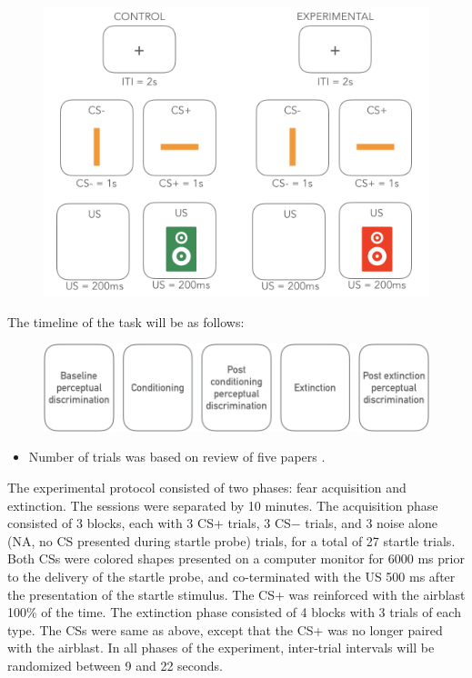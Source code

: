 \documentclass[]{book}
\providecommand{\tightlist}{%
  \setlength{\itemsep}{0pt}\setlength{\parskip}{0pt}}
\begin{document}
\begin{figure}
\centering
\includegraphics{images/information/measures/tasks/disc_cond_ext/5.png}
\caption{}
\end{figure}

The timeline of the task will be as follows:

\begin{figure}
\centering
\includegraphics{images/information/measures/tasks/disc_cond_ext/6.png}
\caption{}
\end{figure}

\begin{itemize}
\tightlist
\item
  Number of trials was based on review of five papers \citetext{\citealp[ (56 trials)]{norrholm_2011}; \citealp[ (72 trials)]{norrholm_2006}; \citealp[ (32 trials)]{schiller_2013}; \citealp[ (34 trials)]{phelps_2004}; \citealp{jovanovic_2014}}.
\end{itemize}

The experimental protocol consisted of two phases: fear acquisition and extinction. The sessions were separated by 10 minutes. The acquisition phase consisted of 3 blocks, each with 3 CS+ trials, 3 CS− trials, and 3 noise alone (NA, no CS presented during startle probe) trials, for a total of 27 startle trials. Both CSs were colored shapes presented on a computer monitor for 6000 ms prior to the delivery of the startle probe, and co-terminated with the US 500 ms after the presentation of the startle stimulus. The CS+ was reinforced with the airblast 100\% of the time. The extinction phase consisted of 4 blocks with 3 trials of each type. The CSs were same as above, except that the CS+ was no longer paired with the airblast. In all phases of the experiment, inter-trial intervals will be randomized between 9 and 22 seconds.
\end{document}
